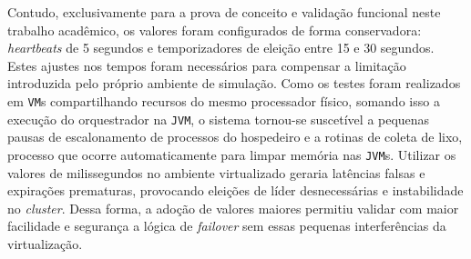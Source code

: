         Contudo, exclusivamente para a prova de conceito e validação funcional neste trabalho acadêmico, os valores foram configurados de forma conservadora: \textit{heartbeats} de 5 segundos e temporizadores de eleição entre 15 e 30 segundos. Estes ajustes nos tempos foram necessários para compensar a limitação introduzida pelo próprio ambiente de simulação. Como os testes foram realizados em \verb|VM|s compartilhando recursos do mesmo processador físico, somando isso a execução do orquestrador na \verb|JVM|, o sistema tornou-se suscetível a pequenas pausas de escalonamento de processos do hospedeiro e a rotinas de coleta de lixo, processo que ocorre automaticamente para limpar memória nas \verb|JVM|s. Utilizar os valores de milissegundos no ambiente virtualizado geraria latências falsas e expirações prematuras, provocando eleições de líder desnecessárias e instabilidade no \textit{cluster}. Dessa forma, a adoção de valores maiores permitiu validar com maior facilidade e segurança a lógica de \textit{failover} sem essas pequenas interferências da virtualização. 